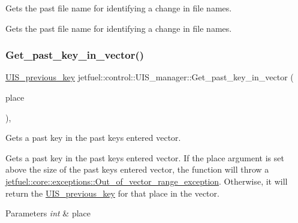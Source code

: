 Gets the past file name for identifying a change in file names. 

Gets the past file name for identifying a change in file names. \mbox{\label{classjetfuel_1_1control_1_1UIS__manager_ac7dc1ae00609d95ba770813d7cbe6846}} 
\subsubsection{\texorpdfstring{Get\+\_\+past\+\_\+key\+\_\+in\+\_\+vector()}{Get\_past\_key\_in\_vector()}}
{\footnotesize\ttfamily \hyperlink{structjetfuel_1_1control_1_1UIS__previous__key}{U\+I\+S\+\_\+previous\+\_\+key} jetfuel\+::control\+::\+U\+I\+S\+\_\+manager\+::\+Get\+\_\+past\+\_\+key\+\_\+in\+\_\+vector (\begin{DoxyParamCaption}\item[{const int}]{place }\end{DoxyParamCaption})\hspace{0.3cm}{\ttfamily [inline]}, {\ttfamily [protected]}}



Gets a past key in the past keys entered vector. 

Gets a past key in the past keys entered vector. If the place argument is set above the size of the past keys entered vector, the function will throw a \hyperlink{classjetfuel_1_1core_1_1exceptions_1_1Out__of__vector__range__exception}{jetfuel\+::core\+::exceptions\+::\+Out\+\_\+of\+\_\+vector\+\_\+range\+\_\+exception}. Otherwise, it will return the \hyperlink{structjetfuel_1_1control_1_1UIS__previous__key}{U\+I\+S\+\_\+previous\+\_\+key} for that place in the vector.


\begin{DoxyParams}{Parameters}
{\em int} & place \\
\hline
\end{DoxyParams}
\mbox{\label{classjetfuel_1_1control_1_1UIS__manager_ab16fc0fc549296bdf8de3964ec933fb8}} 
